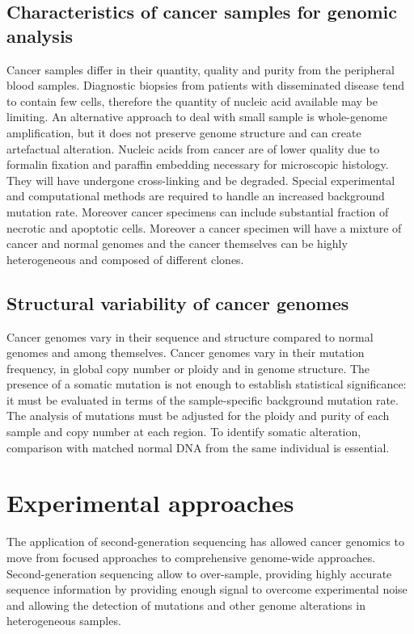 	\subsection{Characteristics of cancer samples for genomic analysis}
	Cancer samples differ in their quantity, quality and purity from the peripheral blood samples.
	Diagnostic biopsies from patients with disseminated disease tend to contain few cells, therefore the quantity of nucleic acid available may be limiting.
	An alternative approach to deal with small sample is whole-genome amplification, but it does not preserve genome structure and can create artefactual alteration.
	Nucleic acids from cancer are of lower quality due to formalin fixation and paraffin embedding necessary for microscopic histology.
	They will have undergone cross-linking and be degraded.
	Special experimental and computational methods are required to handle an increased background mutation rate.
	Moreover cancer specimens can include substantial fraction of necrotic and apoptotic cells.
	Moreover a cancer specimen will have a mixture of cancer and normal genomes and the cancer themselves can be highly heterogeneous and composed of different clones.

	\subsection{Structural variability of cancer genomes}
	Cancer genomes vary in their sequence and structure compared to normal genomes and among themselves.
	Cancer genomes vary in their mutation frequency, in global copy number or ploidy and in genome structure.
	The presence of a somatic mutation is not enough to establish statistical significance: it must be evaluated in terms of the sample-specific background mutation rate.
	The analysis of mutations must be adjusted for the ploidy and purity of each sample and copy number at each region.
	To identify somatic alteration, comparison with matched normal DNA from the same individual is essential.

\section{Experimental approaches}
The application of second-generation sequencing has allowed cancer genomics to move from focused approaches to comprehensive genome-wide approaches.
Second-generation sequencing allow to over-sample, providing highly accurate sequence information by providing enough signal to overcome experimental noise and allowing the detection of mutations and other genome alterations in heterogeneous samples.

